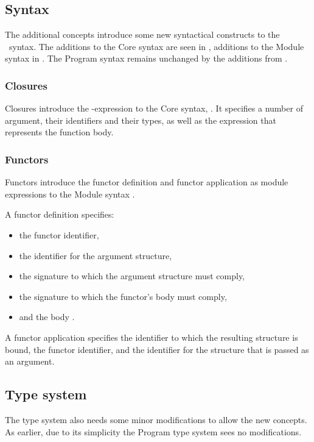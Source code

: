 \subsection{Syntax}
The additional concepts introduce some new syntactical constructs to the \MiniML\ syntax.
The additions to the Core syntax are seen in , additions to the Module syntax in .
The Program syntax remains unchanged by the additions from .

\subsubsection{Closures}
Closures introduce the \cmath{\lambda}-expression to the Core syntax, .
It specifies a number of argument, their identifiers and their types, as well as the expression that represents the function body.


\vspace{-1em} %
\subsubsection{Functors}
Functors introduce the functor definition and functor application as module expressions to the Module syntax .

A functor definition specifies:
\begin{itemize}
\item the functor identifier,
\item the identifier  for the argument structure,
\item the signature  to which the argument structure must comply,
\item the signature  to which the functor's body must comply,
\item and the body .
\end{itemize}
A functor application specifies the identifier to which the resulting structure is bound, the functor identifier, and the identifier for the structure that is passed as an argument.


\subsection{Type system}
The type system also needs some minor modifications to allow the new concepts.
As earlier, due to its simplicity the Program type system sees no modifications.


